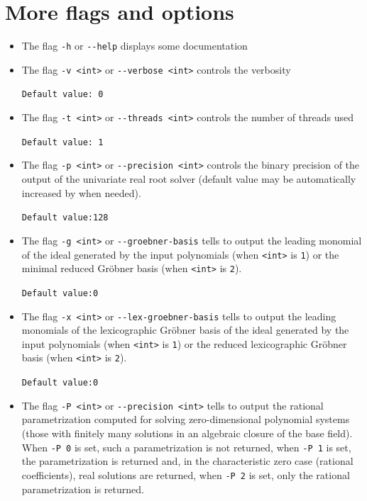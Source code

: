 \documentclass[a4paper,english,11pt]{scrartcl}
\theoremstyle{definition}
\theoremstyle{remark}
\begin{document}
\section{More flags and options}\label{sec:flags}

\begin{itemize}
\item The flag \verb+-h+ or \verb+--help+ displays some documentation

\item The flag \verb+-v <int>+ or \verb+--verbose <int>+ controls the verbosity

  \hfill \verb+Default value: 0+

\item The flag \verb+-t <int>+ or \verb+--threads <int>+
  controls the number of threads used

  \hfill \verb+Default value: 1+

\item The flag \verb+-p <int>+ or \verb+--precision <int>+ controls the binary
  precision of the output of the
  univariate real root
  solver (default value may be automatically increased by \msolve when needed).

  \hfill \verb+Default value:128+
\item The flag \verb+-g <int>+ or \verb+--groebner-basis+ tells \msolve to output
  the leading monomial of
  the ideal generated by the input polynomials (when \verb+<int>+ is \verb+1+)
  or the minimal reduced Gr\"obner basis (when \verb+<int>+ is \verb+2+).

  \hfill \verb+Default value:0+

\item The flag \verb+-x <int>+ or \verb+--lex-groebner-basis+ tells \msolve to output
  the leading monomials of the lexicographic Gr\"obner basis of
  the ideal generated by the input polynomials (when \verb+<int>+ is \verb+1+)
  or the reduced lexicographic
  Gr\"obner basis (when \verb+<int>+ is \verb+2+).

  \hfill \verb+Default value:0+

\item The flag \verb+-P <int>+ or \verb+--precision <int>+ tells \msolve to output the
  rational parametrization computed for solving zero-dimensional polynomial
  systems (those with finitely many solutions in an algebraic closure of the base field).
  When \verb+-P 0+ is set, such a parametrization is not returned, when \verb+-P 1+ is
  set, the parametrization is returned and, in the characteristic zero case (rational
  coefficients), real solutions are returned, when \verb+-P 2+ is set, only the
  rational parametrization is returned.


\end{itemize}
\end{document}
